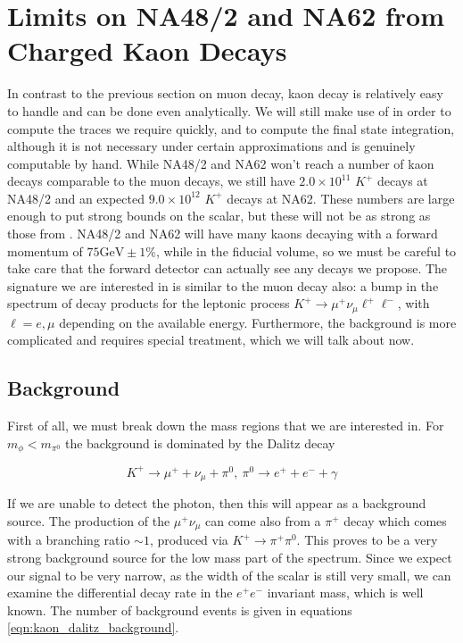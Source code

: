\section{Limits on NA48/2 and NA62 from Charged Kaon Decays}
In contrast to the previous section on muon decay, kaon decay is relatively easy to handle and can be done even analytically.
We will still make use of \feyncalc in order to compute the traces we require quickly, and \mathematica to compute the final state integration, although it is not necessary under certain approximations and is genuinely computable by hand.
While NA48/2 and NA62 won't reach a number of kaon decays comparable to the muon decays, we still have $2.0 \times 10^{11}$ $K^+$ decays at NA48/2 and an expected $9.0 \times 10^{12}$ $K^+$ decays at NA62.
These numbers are large enough to put strong bounds on the scalar, but these will not be as strong as those from \mueee.
NA48/2 and NA62 will have many kaons decaying with a forward momentum of $75\textrm{GeV} \pm 1\%$, while in the fiducial volume, so we must be careful to take care that the forward detector can actually see any decays we propose.
The signature we are interested in is similar to the muon decay also: a bump in the spectrum of decay products for the leptonic process $K^+ \rightarrow \mu^+ \nu_\mu \ell^+ \ell^-$, with $\ell = e, \mu$ depending on the available energy.
Furthermore, the background is more complicated and requires special treatment, which we will talk about now.

\subsection{Background}
First of all, we must break down the mass regions that we are interested in.
For $m_\phi < m_{\pi^0}$ the background is dominated by the Dalitz decay

\begin{equation}
K^+ \rightarrow \mu^+ + \nu_\mu + \pi^0,~\pi^0 \rightarrow e^+ + e^- + \gamma
\end{equation}

\noindent If we are unable to detect the photon, then this will appear as a background source.
The production of the $\mu^+ \nu_\mu$ can come also from a $\pi^+$ decay which comes with a branching ratio $\sim 1$, produced via $K^+ \rightarrow \pi^+ \pi^0$.
This proves to be a very strong background source for the low mass part of the spectrum.
Since we expect our signal to be very narrow, as the width of the scalar is still very small, we can examine the differential decay rate in the $e^+ e^-$ invariant mass, which is well known.
The number of background events is given in equations \ref{eqn:kaon_dalitz_background}.


